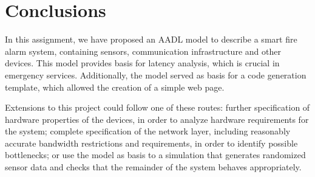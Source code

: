 \section{Conclusions}\label{sec:conclusions}

In this assignment, we have proposed an AADL model to describe a smart fire alarm system, containing sensors, communication infrastructure and other devices. This model provides basis for latency analysis, which is crucial in emergency services. Additionally, the model served as basis for a code generation template, which allowed the creation of a simple web page.

Extensions to this project could follow one of these routes: further specification of hardware properties of the devices, in order to analyze hardware requirements for the system; complete specification of the network layer, including reasonably accurate bandwidth restrictions and requirements, in order to identify possible bottlenecks; or use the model as basis to a simulation that generates randomized sensor data and checks that the remainder of the system behaves appropriately.
